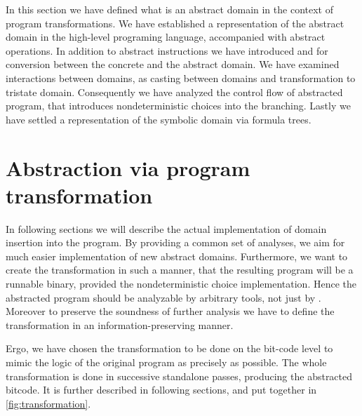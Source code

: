 \begin{summary}
In this section we have defined what is an abstract domain in the context of program
transformations. We have established a representation of the abstract domain in
the high-level programing language, accompanied with abstract operations. In
addition to abstract \LLVM instructions we have introduced  and
 for conversion between the concrete and the abstract domain. We have
examined interactions between domains, as casting between domains and
transformation to tristate domain. Consequently we have analyzed the control flow
of abstracted program, that introduces nondeterministic choices into the
branching. Lastly we have settled a representation of the symbolic domain via formula
trees.
\end{summary}

\section{Abstraction via program transformation}

In following sections we will describe the actual implementation of domain
insertion into the program. By providing a common set of analyses, we aim for
much easier implementation of new abstract domains. Furthermore, we want to
create the transformation in such a manner, that the resulting program will be a
runnable binary, provided the nondeterministic choice implementation. Hence the abstracted program should be
analyzable by arbitrary tools, not just by \DIVINE. Moreover to preserve
the soundness of further analysis we have to define the transformation in an
information-preserving manner.

Ergo, we have chosen the transformation to be done on the \LLVM bit-code level to
mimic the logic of the original program as precisely as possible. The whole
transformation is done in successive standalone \LLVM passes, producing the
abstracted \LLVM bitcode. It is further described in following sections, and put
together in \autoref{fig:transformation}.

